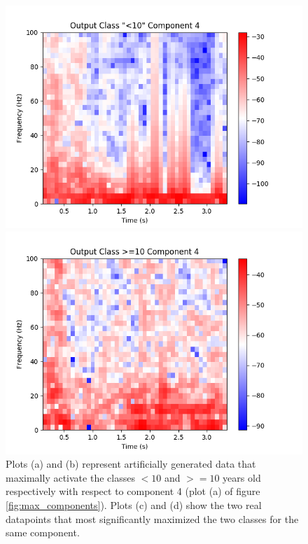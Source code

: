 \documentclass[fleqn,10pt]{wlscirep}
\begin{document}
\begin{figure}
\begin{minipage}{0.47\textwidth}
    \includegraphics[width=\linewidth]{max_act/real_0_4.png}
  \end{minipage}
  \hspace*{\fill} 
  \begin{minipage}{0.47\textwidth}
    \includegraphics[width=\linewidth]{max_act/real_1_4.png}
  \end{minipage}
  \caption{Plots (a) and (b) represent artificially generated data that maximally activate the classes $<10$ and $>=10$ years old respectively with respect to component 4 (plot (a) of figure \ref{fig:max_components}). Plots (c) and (d) show the two real datapoints that most significantly maximized the two classes for the same component.}
  \label{fig:component_4}
\end{figure}
\end{document}
